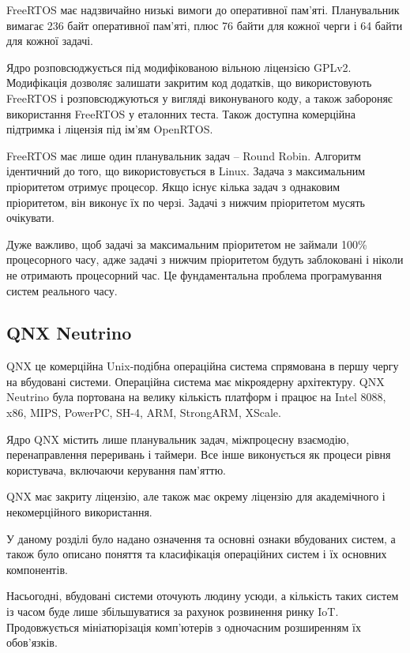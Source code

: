 \documentclass[main.tex]{subfiles}
\begin{document}
FreeRTOS має надзвичайно низькі вимоги до оперативної пам'яті. Планувальник вимагає 236 байт оперативної пам'яті, плюс 76 байти для кожної черги і 64 байти для кожної задачі.

Ядро розповсюджується під модифікованою вільною ліцензією GPLv2\cite{freertos:license}. Модифікація дозволяє залишати закритим код додатків, що використовують FreeRTOS і розповсюджуються у вигляді виконуваного коду, а також забороняє використання FreeRTOS у еталонних теста. Також доступна комерційна підтримка і ліцензія під ім'ям OpenRTOS\cite{openrtos}.

FreeRTOS має лише один планувальник задач -- Round Robin. Алгоритм ідентичний до того, що використовується в Linux. Задача з максимальним пріоритетом отримує процесор. Якщо існує кілька задач з однаковим пріоритетом, він виконує їх по черзі. Задачі з нижчим пріоритетом мусять очікувати.

Дуже важливо, щоб задачі за максимальним пріоритетом не займали 100\% процесорного часу, адже задачі з нижчим пріоритетом будуть заблоковані і ніколи не отримають процесорний час. Це фундаментальна проблема програмування систем реального часу.

\subsection{QNX Neutrino}

QNX\cite{qnx} це комерційна Unix-подібна операційна система спрямована в першу чергу на вбудовані системи. Операційна система має мікроядерну архітектуру. QNX Neutrino була портована на велику кількість платформ і працює на Intel 8088, x86, MIPS, PowerPC, SH-4, ARM, StrongARM, XScale.

Ядро QNX містить лише планувальник задач, міжпроцесну взаємодію, перенаправлення переривань і таймери. Все інше виконується як процеси рівня користувача, включаючи керування пам'яттю.

QNX має закриту ліцензію, але також має окрему ліцензію для академічного і некомерційного використання\cite{qnx:noncommercial}.

\chapterconslusions{}

У даному розділі було надано означення та основні ознаки вбудованих систем, а також було описано поняття та класифікація операційних систем і їх основних компонентів.

Насьогодні, вбудовані системи оточують людину усюди, а кількість таких систем із часом буде лише збільшуватися за рахунок розвинення ринку \acs{IoT}. Продовжується мініатюрізація комп'ютерів з одночасним розширенням їх обов'язків.
\end{document}
